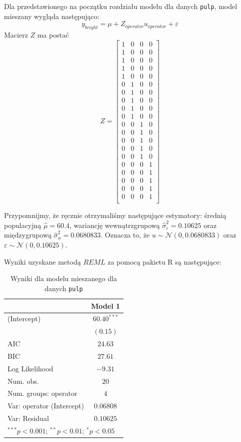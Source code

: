 \documentclass[12pt]{mwbk}
\theoremstyle{plain}
\theoremstyle{definition}
\theoremstyle{remark}
\begin{document}
Dla przedstawionego na początku rozdziału modelu dla danych \texttt{pulp}, model mieszany wygląda następująco:
$$y_{bright}=\mu+ Z_{operator}u_{operator}+\varepsilon$$
Macierz $Z$ ma postać
$$Z=\begin{bmatrix}
1 & 0 & 0 & 0 \\
1 & 0 & 0 & 0 \\
1 & 0 & 0 & 0 \\
1 & 0 & 0 & 0 \\
1 & 0 & 0 & 0 \\
0 & 1 & 0 & 0 \\
0 & 1 & 0 & 0 \\
0 & 1 & 0 & 0 \\
0 & 1 & 0 & 0 \\
0 & 1 & 0 & 0 \\
0 & 0 & 1 & 0 \\
0 & 0 & 1 & 0 \\
0 & 0 & 1 & 0 \\
0 & 0 & 1 & 0 \\
0 & 0 & 1 & 0 \\
0 & 0 & 0 & 1 \\
0 & 0 & 0 & 1 \\
0 & 0 & 0 & 1 \\
0 & 0 & 0 & 1 \\
0 & 0 & 0 & 1 \\
\end{bmatrix}$$

Przypomnijmy, że ręcznie otrzymaliśmy następujące estymatory: średnią populacyjną $\hat{\mu}=60.4$, wariancję wewnątrzgrupową $\hat{\sigma}_{\varepsilon}^2=0.10625$ oraz międzygrupową $\hat{\sigma}_{\alpha}^2=0.0680833$. Oznacza to, że $u \sim \mathcal{N}(0, 0.0680833)$ oraz $\varepsilon \sim \mathcal{N}(0, 0.10625)$.

Wyniki uzyskane metodą $REML$ za pomocą pakietu R są następujące:
\newpage
\begin{table}[!htbp]
	\begin{center}
		\begin{tabular}{l c}
			\hline
			& Model 1 \\
			\hline
			(Intercept)               & $60.40^{***}$ \\
			& $(0.15)$      \\
			\hline
			AIC                       & $24.63$       \\
			BIC                       & $27.61$       \\
			Log Likelihood            & $-9.31$       \\
			Num. obs.                 & $20$          \\
			Num. groups: operator     & $4$           \\
			Var: operator (Intercept) & $0.06808$        \\
			Var: Residual             & $0.10625$        \\
			\hline
			\multicolumn{2}{l}{\scriptsize{$^{***}p<0.001$; $^{**}p<0.01$; $^{*}p<0.05$}}
		\end{tabular}
		\caption{Wyniki dla modelu mieszanego dla danych \texttt{pulp}}
		\label{tab:pulp_model}
	\end{center}
\end{table}
\end{document}

